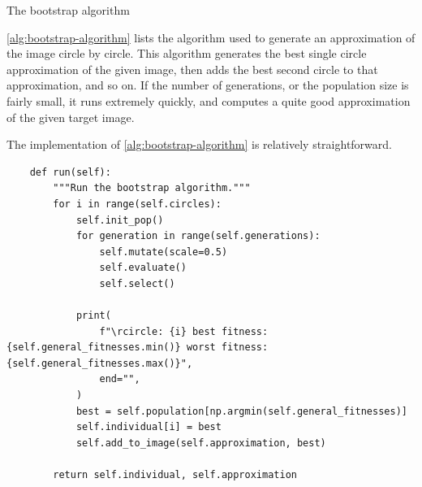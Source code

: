 \documentclass{article}
\begin{document}
\begin{algorithm}[h]
    \begin{algorithmic}
                \EndFor
            \EndFor
            \State{}
        \EndFunction{}
    \end{algorithmic}
    \caption{The bootstrap algorithm}\label{alg:bootstrap-algorithm}
\end{algorithm}

\autoref{alg:bootstrap-algorithm} lists the algorithm used to generate an approximation of the image circle by circle. This algorithm generates the best single circle approximation of the given image, then adds the best second circle to that approximation, and so on. If the number of generations, or the population size is fairly small, it runs extremely quickly, and computes a quite good approximation of the given target image.

The implementation of \autoref{alg:bootstrap-algorithm} is relatively straightforward.

\begin{verbatim}
    def run(self):
        """Run the bootstrap algorithm."""
        for i in range(self.circles):
            self.init_pop()
            for generation in range(self.generations):
                self.mutate(scale=0.5)
                self.evaluate()
                self.select()
    
            print(
                f"\rcircle: {i} best fitness: {self.general_fitnesses.min()} worst fitness: {self.general_fitnesses.max()}",
                end="",
            )
            best = self.population[np.argmin(self.general_fitnesses)]
            self.individual[i] = best
            self.add_to_image(self.approximation, best)

        return self.individual, self.approximation
\end{verbatim}
\end{document}
